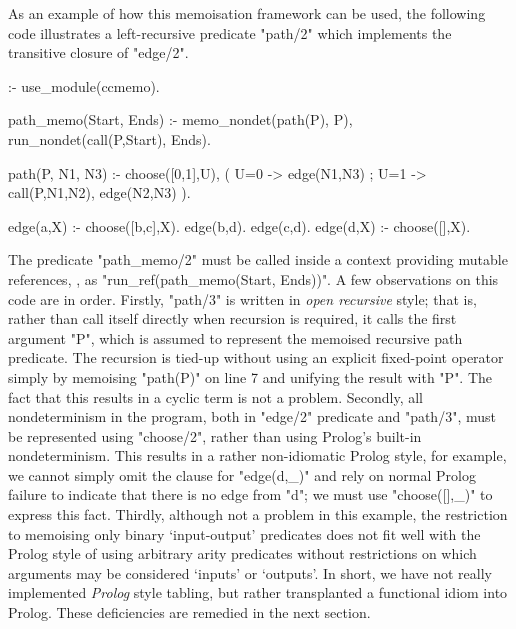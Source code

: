 As an example of how this memoisation framework can be used, the following code illustrates a left-recursive
predicate "path/2" which implements the transitive closure of "edge/2".
\begin{prolog-framed}
  :- use_module(ccmemo).

  path_memo(Start, Ends) :-
    memo_nondet(path(P), P),
    run_nondet(call(P,Start), Ends).

  path(P, N1, N3) :- 
    choose([0,1],U), 
    ( U=0 -> edge(N1,N3)
    ; U=1 -> call(P,N1,N2), edge(N2,N3)
    ).

  edge(a,X) :- choose([b,c],X).
  edge(b,d).
  edge(c,d).
  edge(d,X) :- choose([],X).
\end{prolog-framed}
The predicate "path_memo/2" must be called inside a context providing mutable references, \eg, as
"run_ref(path_memo(Start, Ends))".
A few observations on this code are in order. Firstly, "path/3" is written in \emph{open recursive} style;
that is, rather than call itself directly when recursion is required, it calls the first argument "P", which
is assumed to represent the memoised recursive path predicate. The recursion is tied-up without using
an explicit fixed-point operator simply by memoising "path(P)" on line 7 and unifying the result with "P".
The fact that this results in a cyclic term is not a problem. Secondly, all nondeterminism in the
program, both in "edge/2" predicate and "path/3", must be represented using "choose/2",
rather than using Prolog's built-in nondeterminism. This results in a rather non-idiomatic Prolog style, for
example, we cannot simply omit the clause for "edge(d,_)" and rely on normal Prolog failure to indicate that there is no edge 
from "d"; we must use "choose([],_)" to express this fact. Thirdly, although not a problem in this example,
the restriction to memoising only binary `input-output' predicates does not fit well with the Prolog style
of using arbitrary arity predicates without restrictions on which arguments may be considered
`inputs' or `outputs'. In short, we have not really implemented \emph{Prolog} style tabling, but rather
transplanted a functional idiom into Prolog. These deficiencies are remedied in the next section.



